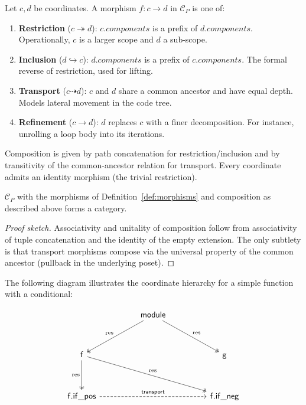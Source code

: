 \documentclass[11pt]{article}
\begin{document}
\begin{definition}\label{def:morphisms}
Let $c, d$ be coordinates.  A morphism $f \colon c \to d$ in $\mathcal{C}_P$
is one of:
\begin{enumerate}[label=(\alph*),nosep]
  \item \textbf{Restriction} ($c \twoheadrightarrow d$):
        $c.\mathit{components}$ is a prefix of $d.\mathit{components}$.
        Operationally, $c$ is a larger scope and $d$ a sub-scope.
  \item \textbf{Inclusion} ($d \hookrightarrow c$):
        $d.\mathit{components}$ is a prefix of $c.\mathit{components}$.
        The formal reverse of restriction, used for lifting.
  \item \textbf{Transport} ($c \dashrightarrow d$):
        $c$ and $d$ share a common ancestor and have equal depth.
        Models lateral movement in the code tree.
  \item \textbf{Refinement} ($c \to d$):
        $d$ replaces $c$ with a finer decomposition.
        For instance, unrolling a loop body into its iterations.
\end{enumerate}
\end{definition}

Composition is given by path concatenation for restriction/inclusion and by
transitivity of the common-ancestor relation for transport.  Every coordinate
admits an identity morphism (the trivial restriction).

\begin{proposition}\label{prop:category}
$\mathcal{C}_P$ with the morphisms of Definition~\ref{def:morphisms} and
composition as described above forms a category.
\end{proposition}
\begin{proof}[Proof sketch]
Associativity and unitality of composition follow from associativity of tuple
concatenation and the identity of the empty extension.  The only subtlety is
that transport morphisms compose via the universal property of the common
ancestor (pullback in the underlying poset).
\end{proof}

The following diagram illustrates the coordinate hierarchy for a simple
function with a conditional:

\[
\begin{tikzcd}[column sep=1.6cm, row sep=1.2cm]
  & \mathsf{module} \arrow[dl, two heads, "\res"'] \arrow[dr, two heads, "\res"] & \\
  \mathsf{f} \arrow[d, two heads, "\res"'] \arrow[drr, two heads, "\res"]
  & & \mathsf{g} \\
  \mathsf{f.if\_pos} \arrow[rr, dashed, "\mathsf{transport}"]
  & & \mathsf{f.if\_neg}
\end{tikzcd}
\]
\end{document}
